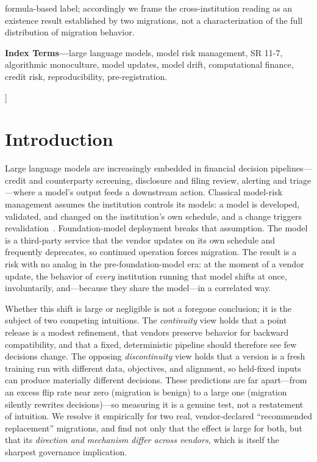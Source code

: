 \documentclass[10pt,twocolumn]{article}
\begin{document}
{{formula-based label; accordingly we frame the cross-institution reading as an existence result established by two migrations, not a characterization of the full distribution of migration behavior.

\vspace{0.55em}
\noindent\textbf{Index Terms---}large language models, model risk management, SR 11-7, algorithmic monoculture, model updates, model drift, computational finance, credit risk, reproducibility, pre-registration.}
\vspace{1.4em}
}]

\section{Introduction}
Large language models are increasingly embedded in financial decision pipelines---credit and counterparty screening, disclosure and filing review, alerting and triage---where a model's output feeds a downstream action. Classical model-risk management assumes the institution controls its models: a model is developed, validated, and changed on the institution's own schedule, and a change triggers revalidation~\cite{sr117}. Foundation-model deployment breaks that assumption. The model is a third-party service that the vendor updates on its own schedule and frequently deprecates, so continued operation forces migration. The result is a risk with no analog in the pre-foundation-model era: at the moment of a vendor update, the behavior of \emph{every} institution running that model shifts at once, involuntarily, and---because they share the model---in a correlated way.

Whether this shift is large or negligible is not a foregone conclusion; it is the subject of two competing intuitions. The \emph{continuity} view holds that a point release is a modest refinement, that vendors preserve behavior for backward compatibility, and that a fixed, deterministic pipeline should therefore see few decisions change. The opposing \emph{discontinuity} view holds that a version is a fresh training run with different data, objectives, and alignment, so held-fixed inputs can produce materially different decisions. These predictions are far apart---from an excess flip rate near zero (migration is benign) to a large one (migration silently rewrites decisions)---so measuring it is a genuine test, not a restatement of intuition. We resolve it empirically for two real, vendor-declared ``recommended replacement'' migrations, and find not only that the effect is large for both, but that its \emph{direction and mechanism differ across vendors}, which is itself the sharpest governance implication.
\end{document}
